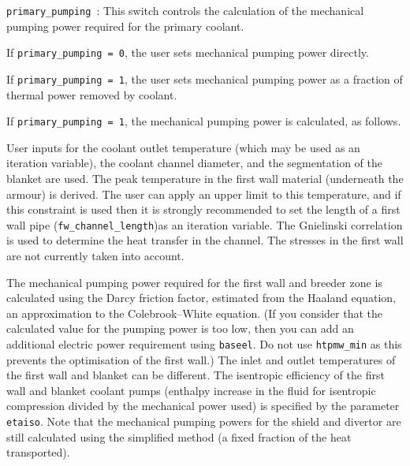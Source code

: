 \documentclass[11pt,a4paper]{report}
\begin{document}
\begin{description}
\item{\texttt{primary\_pumping }:} This switch controls the calculation of the mechanical pumping power required for the primary coolant.

If \texttt{primary\_pumping = 0}, the user sets mechanical pumping power directly.

If \texttt{primary\_pumping = 1}, the user sets mechanical pumping power as a fraction of thermal power removed by coolant.

If \texttt{primary\_pumping = 1}, the mechanical pumping power is calculated, as follows.

User inputs for the coolant outlet temperature (which may be used as an iteration variable), the coolant channel diameter, and the segmentation of the blanket are used.  The peak temperature in the first wall material (underneath the armour) is derived. The user can apply an upper limit to this temperature, and if this constraint is used then it is strongly recommended to set the length of a first wall pipe (\texttt{fw\_channel\_length})as an iteration variable. The Gnielinski correlation is used to determine the heat transfer in the channel.  The stresses in the first wall are not currently taken into account. 

The mechanical pumping power required for the first wall and breeder zone is calculated using the Darcy friction factor, estimated from the Haaland equation, an approximation to the Colebrook–White equation. (If you consider that the calculated value for the pumping power is too low, then you can add an additional electric power requirement using \texttt{baseel}.  Do not use \texttt{htpmw\_min} as this prevents the optimisation of the first wall.) The inlet and outlet temperatures of the first wall and blanket can be different. The isentropic efficiency of the first wall and blanket coolant pumps (enthalpy increase in the fluid for isentropic compression divided by the mechanical power used) is specified by the parameter \texttt{etaiso}.  Note that the mechanical pumping powers for the shield and divertor are still calculated using the simplified method (a fixed fraction of the heat transported). 

\end{description}
\end{document}
